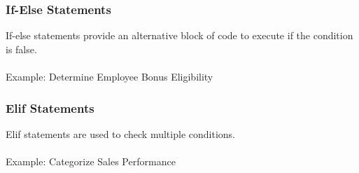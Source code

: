 \documentclass[
  letterpaper,
  DIV=11,
  numbers=noendperiod]{scrreprt}
\makeatletter
\let\oldparagraph\paragraph
\renewcommand{\paragraph}{
    \@ifstar
      \xxxParagraphStar
      \xxxParagraphNoStar
  }
\newcommand{\xxxParagraphStar}[1]{\oldparagraph*{#1}\mbox{}}
\newcommand{\xxxParagraphNoStar}[1]{\oldparagraph{#1}\mbox{}}
\newenvironment{Shaded}{\begin{snugshade}}{\end{snugshade}}
\newcommand{\BuiltInTok}[1]{\textcolor[rgb]{0.00,0.23,0.31}{#1}}
\newcommand{\ControlFlowTok}[1]{\textcolor[rgb]{0.00,0.23,0.31}{\textbf{#1}}}
\newcommand{\DecValTok}[1]{\textcolor[rgb]{0.68,0.00,0.00}{#1}}
\newcommand{\NormalTok}[1]{\textcolor[rgb]{0.00,0.23,0.31}{#1}}
\newcommand{\OperatorTok}[1]{\textcolor[rgb]{0.37,0.37,0.37}{#1}}
\newcommand{\SpecialCharTok}[1]{\textcolor[rgb]{0.37,0.37,0.37}{#1}}
\newcommand{\SpecialStringTok}[1]{\textcolor[rgb]{0.13,0.47,0.30}{#1}}
\newcommand{\StringTok}[1]{\textcolor[rgb]{0.13,0.47,0.30}{#1}}
\makeatother
\begin{document}
\subsubsection{If-Else Statements}\label{if-else-statements}

If-else statements provide an alternative block of code to execute if
the condition is false.

\paragraph{Example: Determine Employee Bonus
Eligibility}\label{example-determine-employee-bonus-eligibility}

\begin{Shaded}
\end{Shaded}

\subsubsection{Elif Statements}\label{elif-statements}

Elif statements are used to check multiple conditions.

\paragraph{Example: Categorize Sales
Performance}\label{example-categorize-sales-performance}
\end{document}
